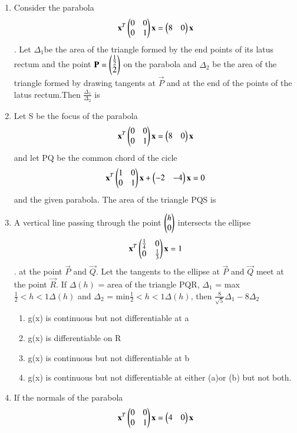 \documentclass[journal,12pt,twocolumn]{IEEEtran}
\begin{document}
\begin{enumerate}[label=\arabic*]
    \item Consider the parabola
    \begin{align}
    \mathbf{x}^T\begin{pmatrix}0&0\\0&1\end{pmatrix}\mathbf{x}=\begin{pmatrix}8&0\end{pmatrix}\mathbf{x}
    \end{align}. Let $\Delta_1$be the area of the triangle formed by the end points of its latus rectum and the point $\mathbf{P}=\begin{pmatrix}\frac{1}{2}\\2\end{pmatrix}$ on the parabola and $\Delta_2$ be the area of the triangle formed by drawing tangents at $\vec{P}$ and at the end of the points of the latus rectum.Then $\frac{\Delta_1}{\Delta_2}$ is
   \item Let S be the focus of the parabola 
   \begin{align}
   \mathbf{x}^T\begin{pmatrix}0&0\\0&1\end{pmatrix}\mathbf{x}=\begin{pmatrix}8&0\end{pmatrix}\mathbf{x}
   \end{align} and let PQ be the common chord of the cicle 
   \begin{align}
   \mathbf{x}^T\begin{pmatrix}1&0\\0&1\end{pmatrix}\mathbf{x}+\begin{pmatrix}-2&-4\end{pmatrix}\mathbf{x}=0
   \end{align} and the given parabola. The area of the triangle PQS is
   \item A vertical line passing through the point $\begin{pmatrix}h\\0\end{pmatrix}$ intersects the ellipse
   \begin{align}
   \mathbf{x}^T\begin{pmatrix}\frac{1}{4}&0\\0&\frac{1}{3}\end{pmatrix}\mathbf{x}=1
   \end{align}. at the point $\vec{P}$ and $\vec{Q}$. Let the tangents to the ellipse at $\vec{P}$ and $\vec{Q}$ meet at the point $\vec{R}$. If $\Delta(h)$ = area of the triangle PQR, $\Delta_1$ = max $\frac{1}{2}<h<1 \Delta(h)$ and $\Delta_2$ = min$\frac{1}{2}<h<1 \Delta(h)$, then $\frac{8}{\sqrt{5}}\Delta_1-8\Delta_2$
    \begin{enumerate}
    \item g(x) is continuous but not differentiable at a
    \item g(x) is  differentiable on R
    \item g(x) is continuous but not differentiable at b
    \item g(x) is continuous but not differentiable at either (a)or (b) but not both.
    \end{enumerate}
    \item If the normals of the parabola
    \begin{align}
    \vec{x}^T\myvec{0&0\\0&1}\vec{x}=\myvec{4&0}\vec{x}

\end{align}
\end{enumerate}
\end{document}
